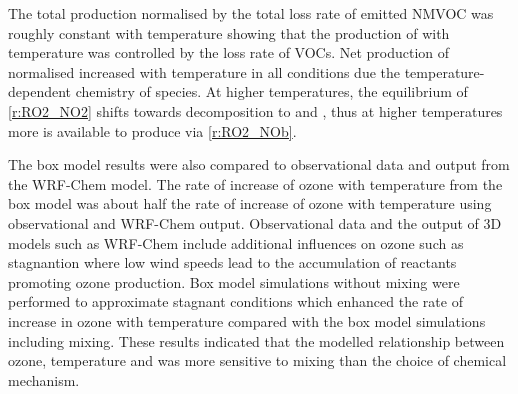 The total  production normalised by the total loss rate of emitted NMVOC was roughly constant with temperature showing that the production of  with temperature was controlled by the loss rate of VOCs.
Net production of normalised  increased with temperature in all  conditions due the temperature-dependent chemistry of  species.
At higher temperatures, the equilibrium of  \eqref{r:RO2_NO2} shifts towards decomposition to  and , thus at higher temperatures more  is available to produce  via \eqref{r:RO2_NOb}.

The box model results were also compared to observational data and output from the WRF-Chem model.
The rate of increase of ozone with temperature from the box model was about half the rate of increase of ozone with temperature using observational and WRF-Chem output.
Observational data and the output of 3D models such as WRF-Chem include additional influences on ozone such as stagnantion where low wind speeds lead to the accumulation of reactants promoting ozone production.
Box model simulations without mixing were performed to approximate stagnant conditions which enhanced the rate of increase in ozone with temperature compared with the box model simulations including mixing.
These results indicated that the modelled relationship between ozone, temperature and  was more sensitive to mixing than the choice of chemical mechanism.
